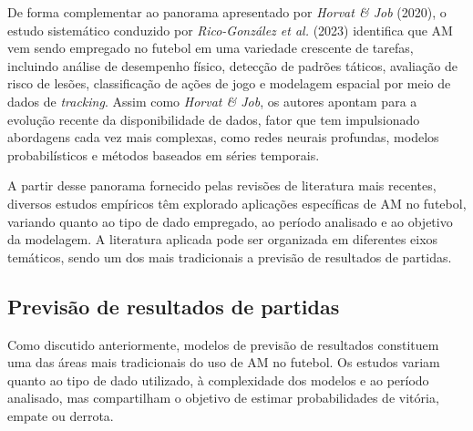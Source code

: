 De forma complementar ao panorama apresentado por \textit{Horvat & Job} (2020), o estudo sistemático conduzido por \textit{Rico-González et al.} (2023) identifica que
AM vem sendo empregado no futebol em uma variedade crescente de tarefas, incluindo análise de desempenho físico, detecção de padrões táticos, avaliação de risco de
lesões, classificação de ações de jogo e modelagem espacial por meio de dados de \textit{tracking}. Assim como \textit{Horvat & Job}, os autores apontam para a evolução
recente da disponibilidade de dados, fator que tem impulsionado abordagens cada vez mais complexas, como redes neurais profundas, modelos probabilísticos e métodos baseados
em séries temporais.

A partir desse panorama fornecido pelas revisões de literatura mais recentes, diversos estudos empíricos têm explorado aplicações específicas de AM no futebol, variando 
quanto ao tipo de dado empregado, ao período analisado e ao objetivo da modelagem. A literatura aplicada pode ser organizada em diferentes eixos temáticos, sendo um dos mais 
tradicionais a previsão de resultados de partidas.


\subsection{Previsão de resultados de partidas}

Como discutido anteriormente, modelos de previsão de resultados constituem uma das áreas mais tradicionais do uso de AM no futebol. Os estudos 
variam quanto ao tipo de dado utilizado, à complexidade dos modelos e ao período analisado, mas compartilham o objetivo de estimar probabilidades de vitória, 
empate ou derrota.

